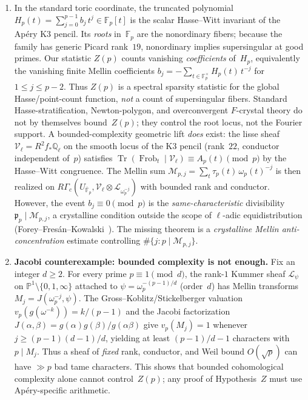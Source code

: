 \documentclass[11pt]{article}
\theoremstyle{definition}
\theoremstyle{remark}
\begin{document}
\begin{enumerate}
\item In the standard toric coordinate, the truncated
polynomial
$H_p(t) = \sum_{j=0}^{p-1} b_j\, t^j \in \mathbb{F}_p[t]$
is the scalar Hasse--Witt invariant of the
Ap\'ery K3 pencil.
Its \emph{roots} in~$\mathbb{F}_p$ are the
nonordinary fibers; because the family
has generic Picard rank~$19$, nonordinary
implies supersingular at good primes.
Our statistic $Z(p)$ counts vanishing
\emph{coefficients} of~$H_p$, equivalently
the vanishing finite Mellin coefficients
$b_j = -\sum_{t \in \mathbb{F}_p^\times} H_p(t)\, t^{-j}$
for $1 \le j \le p - 2$.
Thus $Z(p)$ is a spectral sparsity statistic
for the global Hasse/point-count function,
\emph{not} a count of supersingular fibers.
Standard Hasse-stratification, Newton-polygon,
and overconvergent $F$-crystal theory
do not by themselves bound~$Z(p)$;
they control the root locus, not the
Fourier support.
A bounded-complexity geometric lift \emph{does}
exist: the lisse sheaf
$\mathcal{V}_\ell = R^2f_*\mathbb{Q}_\ell$
on the smooth locus of the K3 pencil
(rank~$22$, conductor independent of~$p$)
satisfies $\operatorname{Tr}(\operatorname{Frob}_t
\mid \mathcal{V}_\ell) \equiv A_p(t) \pmod{p}$
by the Hasse--Witt congruence.
The Mellin sum $\mathscr{M}_{p,j}
= \sum_t \tau_p(t)\,\omega_p(t)^{-j}$
is then realized on
$R\Gamma_c(U_{\bar{\mathbb{F}}_p},
\mathcal{V}_\ell \otimes \mathcal{L}_{\omega_p^{-j}})$
with bounded rank and conductor.
However, the event $b_j \equiv 0 \pmod{p}$
is the \emph{same-characteristic} divisibility
$\mathfrak{p}_p \mid \mathscr{M}_{p,j}$,
a crystalline condition outside the scope of
$\ell$-adic equidistribution
(Forey--Fres\'an--Kowalski~\cite{FFK2023}).
The missing theorem is a
\emph{crystalline Mellin anti-concentration}
estimate controlling $\#\{j : p \mid
\mathscr{M}_{p,j}\}$.

\item \textbf{Jacobi counterexample: bounded complexity is
  not enough.}
Fix an integer $d \ge 2$.
For every prime $p \equiv 1 \pmod{d}$,
the rank-$1$ Kummer sheaf
$\mathcal{L}_{\psi}$ on
$\mathbb{P}^1 \setminus \{0,1,\infty\}$
attached to $\psi = \omega_p^{-(p-1)/d}$
(order~$d$)
has Mellin transforms
$M_j = J(\omega_p^{-j}, \psi)$.
The Gross--Koblitz/Stickelberger valuation
$v_p(g(\omega^{-k})) = k/(p{-}1)$
and the Jacobi factorization
$J(\alpha,\beta) = g(\alpha)g(\beta)/g(\alpha\beta)$
give $v_p(M_j) = 1$ whenever
$j \ge (p{-}1)(d{-}1)/d$,
yielding at least $(p{-}1)/d - 1$
characters with $p \mid M_j$.
Thus a sheaf of \emph{fixed} rank, conductor,
and Weil bound $O(\sqrt{p})$ can have
$\gg p$ bad tame characters.
This shows that bounded cohomological
complexity alone cannot control~$Z(p)$;
any proof of Hypothesis~$Z$ must use
Ap\'ery-specific arithmetic.


\end{enumerate}
\end{document}

